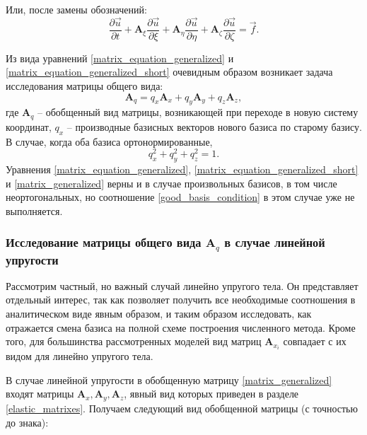 Или, после замены обозначений:
\begin{equation}
\label{matrix_equation_generalized_short}
\frac{\partial\vec{u}}{\partial{t}} + \mathbf{A}_\xi \frac{\partial\vec{u}}{\partial{\xi}} + 
\mathbf{A}_\eta \frac{\partial\vec{u}}{\partial{\eta}} + \mathbf{A}_\zeta \frac{\partial\vec{u}}{\partial{\zeta}} = \vec f.
\end{equation}

Из вида уравнений \ref{matrix_equation_generalized} и \ref{matrix_equation_generalized_short} очевидным образом возникает задача исследования матрицы общего вида:
\begin{equation}
\label{matrix_generalized}
\mathbf{A}_q = q_x \mathbf{A}_x  + q_y \mathbf{A}_y + q_z \mathbf{A}_z,
\end{equation}
где $\mathbf{A}_q$ -- обобщенный вид матрицы, возникающей при переходе в новую систему координат, $q_x$ -- производные базисных векторов нового базиса по старому базису. В случае, когда оба базиса ортонормированные,
\begin{equation}
\label{good_basis_condition}
q_x^2 + q_y^2 + q_z^2 = 1.
\end{equation}
Уравнения \ref{matrix_equation_generalized}, \ref{matrix_equation_generalized_short} и \ref{matrix_generalized} верны и в случае произвольных базисов, в том числе неортогональных, но соотношение \ref{good_basis_condition} в этом случае уже не выполняется.

\subsubsection{Исследование матрицы общего вида $\mathbf{A}_q$ в случае линейной упругости}

Рассмотрим частный, но важный случай линейно упругого тела. Он представляет отдельный интерес, так как позволяет получить все необходимые соотношения в аналитическом виде явным образом, и таким образом исследовать, как отражается смена базиса на полной схеме построения численного метода. Кроме того, для большинства рассмотренных моделей вид матриц $\mathbf A_{x_i}$ совпадает с их видом для линейно упругого тела.

В случае линейной упругости в обобщенную матрицу \ref{matrix_generalized} входят матрицы $\mathbf{A}_x, \mathbf{A}_y, \mathbf{A}_z$, явный вид которых приведен в разделе \ref{elastic_matrixes}. Получаем следующий вид обобщенной матрицы (с точностью до знака):

